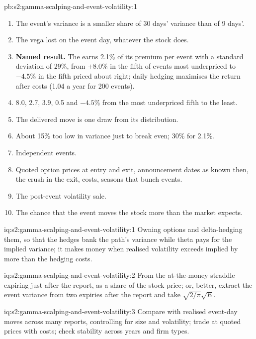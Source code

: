 \begin{solution}{pb:s2:gamma-scalping-and-event-volatility:1}
\begin{enumerate}
\item The event's variance is a smaller share of 30 days' variance than of 9 days'.
\item The vega lost on the event day, whatever the stock does.
\item \textbf{Named result.} The  earns 2.1\% of its premium per event with a standard deviation of 29\%, from $+8.0\%$ in the fifth of
events most underpriced to $-4.5\%$ in the fifth priced about right; daily hedging maximises the return after costs (1.04 a year for 200 events).
\item 8.0, 2.7, 3.9, 0.5 and $-4.5\%$ from the most underpriced fifth to the least.
\item The delivered move is one draw from its distribution.
\item About 15\% too low in variance just to break even; 30\% for 2.1\%.
\item Independent events.
\item Quoted option prices at entry and exit, announcement dates as known then, the crush in the exit, costs, seasons that bunch events.
\item The post-event volatility sale.
\item The chance that the event moves the stock more than the market expects.
\end{enumerate}
\end{solution}

\begin{solution}{iq:s2:gamma-scalping-and-event-volatility:1}
Owning options and delta-hedging them, so that the hedges bank the path's variance while theta pays for the implied variance; it makes money when
realised volatility exceeds implied by more than the hedging costs.
\end{solution}

\begin{solution}{iq:s2:gamma-scalping-and-event-volatility:2}
From the at-the-money straddle expiring just after the report, as a share of the stock price; or, better, extract the event variance from two expiries
after the report and take $\sqrt{2/\pi}\sqrt{E}$.
\end{solution}

\begin{solution}{iq:s2:gamma-scalping-and-event-volatility:3}
Compare  with realised event-day moves across many reports, controlling for size and volatility; trade  at quoted prices
with costs; check stability across years and firm types.
\end{solution}

